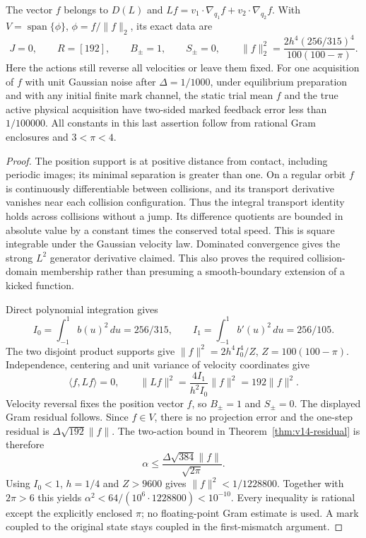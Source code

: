 \begin{proposition}
\label{prop:v15-bump}
The vector $f$ belongs to $D(L)$ and
$Lf=v_1\cdot\nabla_{q_1}f+v_2\cdot\nabla_{q_2}f$. With
$V=\operatorname{span}\{\phi\}$, $\phi=f/\|f\|_2$, its exact data are
\begin{equation}\label{eq:v15-bump-gram}
 J=0,\qquad R=[192],\qquad B_{\pm}=1,\qquad S_{\pm}=0,
 \qquad
 \|f\|_2^2=\frac{2h^4(256/315)^4}{100(100-\pi)}.
\end{equation}
Here the actions still reverse all velocities or leave them fixed.
For one acquisition of $f$ with unit Gaussian noise after
$\Delta=1/1000$, under equilibrium preparation and with any initial
finite mark channel, the static trial mean $f$ and the true active
physical acquisition have two-sided marked feedback error less than
$1/100000$. All constants in this last assertion follow from rational
Gram enclosures and $3<\pi<4$.
\end{proposition}
\begin{proof}
The position support is at positive distance from contact, including
periodic images; its minimal separation is greater than one. On a
regular orbit $f$ is continuously differentiable between collisions,
and its transport derivative vanishes near each collision configuration.
Thus the integral transport identity holds across collisions without a
jump. Its difference quotients are bounded in absolute value by a
constant times the conserved total speed. This is square integrable
under the Gaussian velocity law. Dominated convergence gives the
strong $L^2$ generator derivative claimed. This also proves the required
collision-domain membership rather than presuming a smooth-boundary
extension of a kicked function.

Direct polynomial integration gives
\[
 I_0=\int_{-1}^1b(u)^2\,du=256/315,\qquad
 I_1=\int_{-1}^1b'(u)^2\,du=256/105.
\]
The two disjoint product supports give $\|f\|^2=2h^4I_0^4/Z$,
$Z=100(100-\pi)$. Independence, centering and unit variance of velocity
coordinates give
\[
 \langle f,Lf\rangle=0,\qquad
 \|Lf\|^2=\frac{4I_1}{h^2I_0}\|f\|^2=192\|f\|^2.
\]
Velocity reversal fixes the position vector $f$, so $B_{\pm}=1$ and
$S_{\pm}=0$. The displayed Gram residual follows. Since $f\in V$,
there is no projection error and the one-step residual is
$\Delta\sqrt{192}\|f\|$. The two-action bound in
Theorem~\ref{thm:v14-residual} is therefore
\[
 \alpha\le \frac{\Delta\sqrt{384}\|f\|}{\sqrt{2\pi}}.
\]
Using $I_0<1$, $h=1/4$ and $Z>9600$ gives
$\|f\|^2<1/1228800$. Together with $2\pi>6$ this yields
$\alpha^2<64/(10^6\cdot1228800)<10^{-10}$.
Every inequality is rational except the explicitly enclosed $\pi$;
no floating-point Gram estimate is used. A mark coupled to the original
state stays coupled in the first-mismatch argument.
\end{proof}

